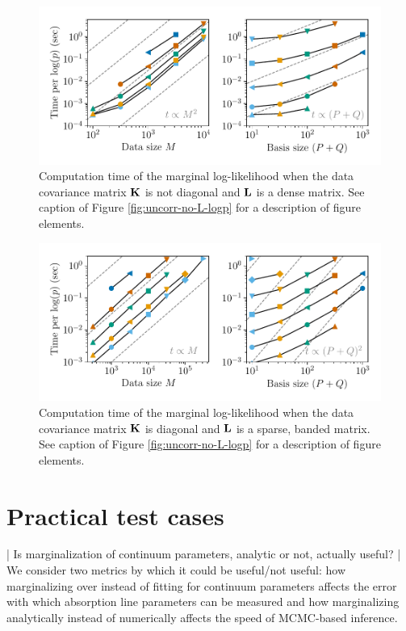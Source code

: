 \documentclass[manuscript]{aastex62}
\newcommand{\vx}[1]{{\bf {#1}}}
\begin{document}
\begin{figure}
  \includegraphics{corr_yes_L_scaling.pdf}
  \caption{Computation time of the marginal log-likelihood when the data covariance matrix $\vx{K}$ is not diagonal and $\vx{L}$ is a dense matrix. See caption of Figure \ref{fig:uncorr-no-L-logp} for a description of figure elements.}
  \label{fig:corr-yes-L-logp}
\end{figure}

\begin{figure}
  \includegraphics{uncorr_sparse_L_scaling.pdf}
  \caption{Computation time of the marginal log-likelihood when the data covariance matrix $\vx{K}$ is diagonal and $\vx{L}$ is a sparse, banded matrix. See caption of Figure \ref{fig:uncorr-no-L-logp} for a description of figure elements.}
  \label{fig:uncorr-sparse-L-logp}
\end{figure}

\section{Practical test cases}
\label{sec:test-cases}
| Is marginalization of continuum parameters, analytic or not, actually useful?
| We consider two metrics by which it could be useful/not useful: how marginalizing over instead of fitting for continuum parameters affects the error with which absorption line parameters can be measured and how marginalizing analytically instead of numerically affects the speed of MCMC-based inference.
\end{document}
